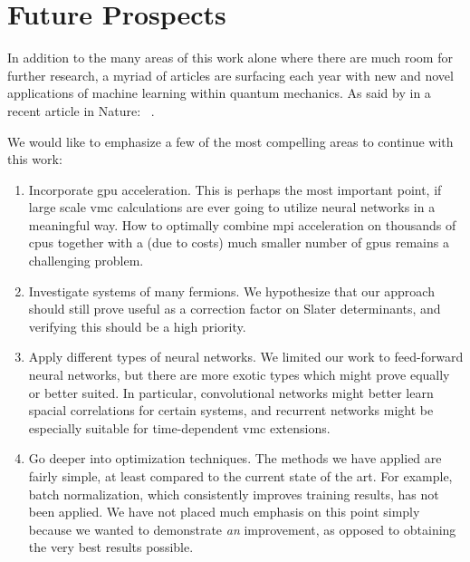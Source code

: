 \documentclass[Thesis.tex]{subfiles}
\begin{document}
\section{Future Prospects}

In addition to the many areas of this work alone where there are much room for
further research, a myriad of articles are surfacing each year with new and
novel applications of machine learning within quantum mechanics. As said by
\citeauthor{Melko-2019} in a recent article in Nature: ~\cite{Melko-2019}.

We would like to emphasize a few of the most compelling areas to continue with
this work:

\begin{enumerate}
\item Incorporate \gls{gpu} acceleration. This is perhaps the most important point, if
  large scale \gls{vmc} calculations are ever going to utilize neural networks in a
  meaningful way. How to optimally combine \gls{mpi} acceleration on thousands of \glspl{cpu}
  together with a (due to costs) much smaller number of \glspl{gpu} remains a
  challenging problem.
\item Investigate systems of many fermions. We hypothesize that our approach
  should still prove useful as a correction factor on Slater determinants, and
  verifying this should be a high priority.
\item Apply different types of neural networks. We limited our work to
  feed-forward neural networks, but there are more exotic types which might
  prove equally or better suited. In particular, convolutional networks might
  better learn spacial correlations for certain systems, and recurrent networks
  might be especially suitable for time-dependent \gls{vmc} extensions.
\item Go deeper into optimization techniques. The methods we have applied are
  fairly simple, at least compared to the current state of the art. For example,
  batch normalization, which consistently improves training results, has not
  been applied. We have not placed much emphasis on this point simply because we
  wanted to demonstrate \emph{an} improvement, as opposed to obtaining the very
  best results possible.
\end{enumerate}
\end{document}

